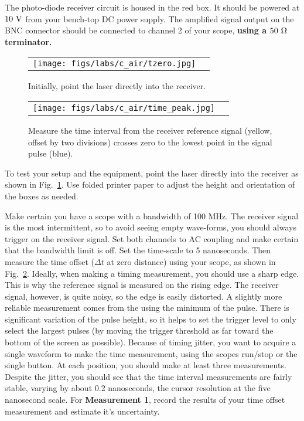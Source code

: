 The photo-diode receiver circuit is housed in the red box.  It should
be powered at $10~\rm V$ from your bench-top DC power supply.  The
amplified signal output on the BNC connector should be connected to
channel 2 of your scope, {\bf using a $50~\rm \Omega$ terminator.}


\begin{figure}[htbp]
\begin{center}
\begin{tabular}{cc}
\texttt{[image: figs/labs/c\_air/tzero.jpg]}
\end{tabular}
\end{center}
\caption{\label{fig:ctzero} Initially, point the laser directly into the receiver.}
\end{figure}

\begin{figure}[htbp]
\begin{center}
\begin{tabular}{cc}
\texttt{[image: figs/labs/c\_air/time\_peak.jpg]}
\end{tabular}
\end{center}
\caption{\label{fig:ctime} Measure the time interval from the receiver reference signal (yellow, offset by two divisions) crosses zero to the lowest point in the signal pulse (blue).}
\end{figure}

To test your setup and the equipment, point the laser directly into
the receiver as shown in Fig.~\ref{fig:ctzero}.  Use folded printer
paper to adjust the height and orientation of the boxes as needed.  

Make certain you have a scope with a bandwidth of 100 MHz.  The
receiver signal is the most intermittent, so to avoid seeing empty
wave-forms, you should always trigger on the receiver signal.  Set
both channels to AC coupling and make certain that the bandwidth limit
is off.  Set the time-scale to 5 nanoseconds.  Then measure the time
offset ($\Delta t$ at zero distance) using your scope, as shown in
Fig.~\ref{fig:ctime}.  Ideally, when making a timing measurement, you
should use a sharp edge.  This is why the reference signal is measured
on the rising edge.  The receiver signal, however, is quite noisy, so
the edge is easily distorted.  A slightly more reliable measurement
comes from the using the minimum of the pulse.  There is significant
variation of the pulse height, so it helps to set the trigger level to
only select the largest pulses (by moving the trigger threshold as far
toward the bottom of the screen as possible).  Because of timing
jitter, you want to acquire a single waveform to make the time
measurement, using the scopes run/stop or the single button.  At each
position, you should make at least three measurements.  Despite the
jitter, you should see that the time interval measurements are fairly
stable, varying by about 0.2 nanoseconds, the cursor resolution at the
five nanosecond scale.  For {\bf Measurement 1}, record the results of
your time offset measurement and estimate it's uncertainty.

